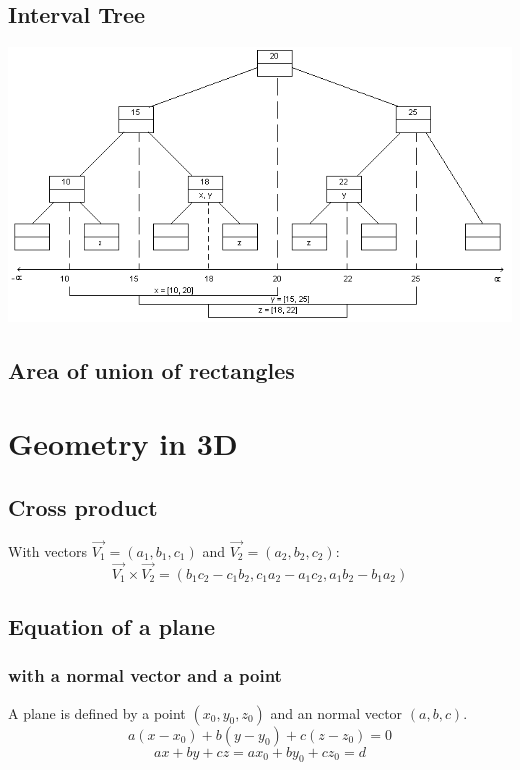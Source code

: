 \subsection{Interval Tree}

\includegraphics[scale=0.38]{geometry/it.png}



\subsection{Area of union of rectangles}



%

\section{Geometry in 3D}
\subsection{Cross product}
With vectors $\vec{V_1}=(a_1, b_1, c_1)$ and $\vec{V_2}=(a_2, b_2, c_2)$:
$$\vec{V_1}\times\vec{V_2}=(b_1c_2-c_1b_2, c_1a_2-a_1c_2, a_1b_2-b_1a_2)$$
\subsection{Equation of a plane}
\subsubsection{with a normal vector and a point}
A plane is defined by a point $(x_0, y_0, z_0)$ and an normal vector $(a, b, c)$.
$$a(x-x_0)+b(y-y_0)+c(z-z_0)=0$$
$$ax+by+cz=ax_0+by_0+cz_0=d$$
